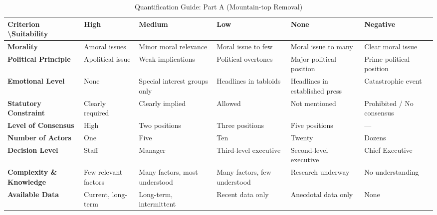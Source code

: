 \documentclass[journal, onecolumn, 12pt]{IEEEtran}
\begin{document}
\begin{table}[h]
    \caption{Quantification Guide: Part A (Mountain-top Removal)}
    \label{tab:guide_part_a}
    \centering
    \begin{tabular}{@{}p{2.5cm}p{2.5cm}p{2.5cm}p{2.5cm}p{2.5cm}p{2.5cm}@{}}
    \toprule
    \textbf{Criterion \textbackslash Suitability} & \textbf{High } & \textbf{Medium} & \textbf{Low} & \textbf{None} & \textbf{Negative} \\ \midrule
    
    \textbf{Morality} & Amoral issues & Minor moral relevance & Moral issue to few & \cellcolor{myred} Moral issue to many &  Clear moral issue \\ \addlinespace
    
    \textbf{Political Principle} & Apolitical issue & Weak implications & Political overtones & Major political position & \cellcolor{myred} Prime political position \\ \addlinespace
    
    \textbf{Emotional Level} & None & Special interest groups only & Headlines in tabloids & \cellcolor{myred} Headlines in established press &  Catastrophic event \\ \addlinespace
    
    \textbf{Statutory Constraint} & \cellcolor{mygreen} Clearly required & Clearly implied & Allowed & Not mentioned &  Prohibited / No consensus \\ \addlinespace
    
    \textbf{Level of Consensus} & High & \cellcolor{mygreen} Two positions & Three positions & Five positions & --- \\ \addlinespace
    
    \textbf{Number of Actors} & One & Five & Ten & Twenty & \cellcolor{myred} Dozens \\ \addlinespace
    
    \textbf{Decision Level} & Staff & Manager & Third-level executive & Second-level executive & \cellcolor{myred} Chief Executive \\ \addlinespace
    
    \textbf{Complexity \& Knowledge} & Few relevant factors & Many factors, most understood & \cellcolor{myyellow} Many factors, few understood & Research underway & No understanding \\ \addlinespace
    
    \textbf{Available Data} & Current, long-term & Long-term, intermittent & \cellcolor{myyellow} Recent data only & Anecdotal data only & None \\ \bottomrule
    \end{tabular}
\end{table}
\end{document}
